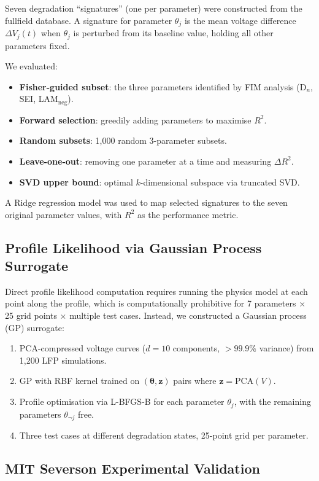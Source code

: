 \documentclass[preprint,12pt]{elsarticle}
\begin{document}
Seven degradation ``signatures'' (one per parameter) were constructed from the fullfield database.
A signature for parameter $\theta_j$ is the mean voltage difference $\Delta V_j(t)$ when $\theta_j$ is perturbed from its baseline value, holding all other parameters fixed.

We evaluated:
\begin{itemize}
\item \textbf{Fisher-guided subset}: the three parameters identified by FIM analysis (D$_n$, SEI, LAM$_{\mathrm{neg}}$).
\item \textbf{Forward selection}: greedily adding parameters to maximise $R^2$.
\item \textbf{Random subsets}: 1{,}000 random 3-parameter subsets.
\item \textbf{Leave-one-out}: removing one parameter at a time and measuring $\Delta R^2$.
\item \textbf{SVD upper bound}: optimal $k$-dimensional subspace via truncated SVD.
\end{itemize}

A Ridge regression model was used to map selected signatures to the seven original parameter values, with $R^2$ as the performance metric.

\subsection{Profile Likelihood via Gaussian Process Surrogate}
\label{sec:gp_pl}

Direct profile likelihood computation requires running the physics model at each point along the profile, which is computationally prohibitive for 7 parameters $\times$ 25 grid points $\times$ multiple test cases.
Instead, we constructed a Gaussian process (GP) surrogate:
\begin{enumerate}
\item PCA-compressed voltage curves ($d = 10$ components, $>99.9\%$ variance) from 1{,}200 LFP simulations.
\item GP with RBF kernel trained on $(\bm{\theta}, \bm{z})$ pairs where $\bm{z} = \mathrm{PCA}(V)$.
\item Profile optimisation via L-BFGS-B for each parameter $\theta_j$, with the remaining parameters $\theta_{\neg j}$ free.
\item Three test cases at different degradation states, 25-point grid per parameter.
\end{enumerate}

\subsection{MIT Severson Experimental Validation}
\label{sec:severson}
\end{document}
